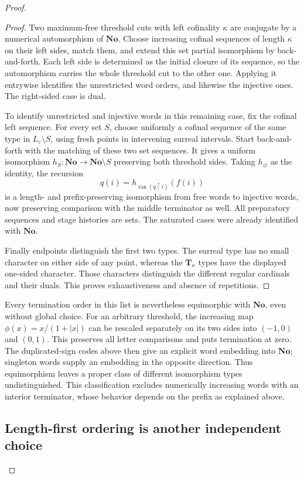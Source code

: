 \documentclass[11pt]{article}
\theoremstyle{definition}
\theoremstyle{remark}
\newcommand{\No}{\mathbf{No}}
\newcommand{\ran}{\operatorname{ran}}
\newcommand{\res}{\mathbin{\upharpoonright}}
\begin{document}
\begin{proof}
\begin{proof}
Two maximum-free threshold cuts with left cofinality $\kappa$ are
conjugate by a numerical automorphism of $\No$. Choose increasing
cofinal sequences of length $\kappa$ on their left sides, match them,
and extend this set partial isomorphism by back-and-forth. Each left
side is determined as the initial closure of its sequence, so the
automorphism carries the whole threshold cut to the other one.
Applying it entrywise identifies the unrestricted word orders, and
likewise the injective ones. The right-sided case is dual.

To identify unrestricted and injective words in this remaining case,
fix the cofinal left sequence. For every set $S$, choose uniformly a
cofinal sequence of the same type in $L_\varepsilon\setminus S$,
using fresh points in intervening surreal intervals. Start
back-and-forth with the matching of these two set sequences. It gives
a uniform isomorphism $h_S:\No\to\No\setminus S$ preserving both
threshold sides. Taking $h_\varnothing$ as the identity, the recursion
\[
 q(i)=h_{\ran(q\res i)}(f(i))
\]
is a length- and prefix-preserving isomorphism from free words to
injective words, now preserving comparison with the middle terminator
as well. All preparatory sequences and stage histories are sets.
The saturated cases were already identified with $\No$.

Finally endpoints distinguish the first two types. The surreal type
has no small character on either side of any point, whereas the
$\mathbf T_\kappa$ types have the displayed one-sided character. Those
characters distinguish the different regular cardinals and their
duals. This proves exhaustiveness and absence of repetitions.
\end{proof}

Every termination order in this list is nevertheless equimorphic with
$\No$, even without global choice. For an arbitrary threshold, the
increasing map $\phi(x)=x/(1+|x|)$ can be rescaled separately on its
two sides into $(-1,0)$ and $(0,1)$. This preserves all letter
comparisons and puts termination at zero. The duplicated-sign codes
above then give an explicit word embedding into $\No$; singleton
words supply an embedding in the opposite direction. Thus equimorphism
leaves a proper class of different isomorphism types undistinguished.
This classification excludes numerically increasing words with an
interior terminator, whose behavior depends on the prefix as explained
above.

\subsection{Length-first ordering is another independent choice}


\end{proof}
\end{document}
